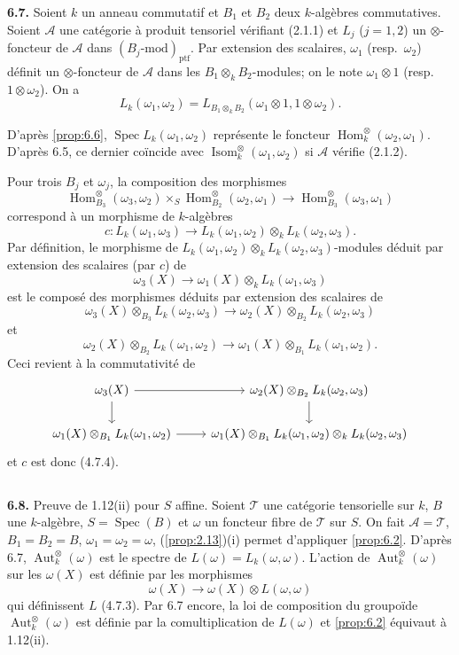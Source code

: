 \documentclass[12pt,a4paper]{article}
\theoremstyle{plain}
\theoremstyle{definition}
\theoremstyle{remark}
\DeclareMathOperator{\Hom}{Hom}
\DeclareMathOperator{\Aut}{Aut}
\DeclareMathOperator{\Isom}{Isom}
\DeclareMathOperator{\Spec}{Spec}
\begin{document}
\textbf{6.7.} Soient $k$ un anneau commutatif et $B_1$ et $B_2$ deux $k$-algèbres commutatives. Soient $\mathcal{A}$ une catégorie à produit tensoriel vérifiant (2.1.1) et $L_j$ ($j = 1,2$) un $\otimes$-foncteur de $\mathcal{A}$ dans $(B_j\text{-mod})_\mathrm{ptf}$. Par extension des scalaires, $\omega_1$ (resp.~$\omega_2$) définit un $\otimes$-foncteur de $\mathcal{A}$ dans les $B_1 \otimes_k B_2$-modules; on le note $\omega_1 \otimes 1$ (resp.~$1 \otimes \omega_2$). On a
\[
L_k(\omega_1, \omega_2) = L_{B_1 \otimes_k B_2}(\omega_1 \otimes 1, 1 \otimes \omega_2).
\]

D'après \ref{prop:6.6}, $\Spec L_k(\omega_1,\omega_2)$ représente le foncteur $\Hom^\otimes_k(\omega_2,\omega_1)$. D'après 6.5, ce dernier coïncide avec $\Isom^\otimes_k(\omega_1,\omega_2)$ si $\mathcal{A}$ vérifie (2.1.2).

Pour trois $B_j$ et $\omega_j$, la composition des morphismes
\[
\Hom^\otimes_{B_3}(\omega_3,\omega_2) \times_S \Hom^\otimes_{B_2}(\omega_2,\omega_1) \to \Hom^\otimes_{B_3}(\omega_3,\omega_1)
\]
correspond à un morphisme de $k$-algèbres
\[
c : L_k(\omega_1,\omega_3) \to L_k(\omega_1,\omega_2) \otimes_k L_k(\omega_2,\omega_3).
\]
Par définition, le morphisme de $L_k(\omega_1,\omega_2) \otimes_k L_k(\omega_2,\omega_3)$-modules déduit par extension des scalaires (par $c$) de
\[
\omega_3(X) \to \omega_1(X) \otimes_k L_k(\omega_1,\omega_3)
\]
est le composé des morphismes déduits par extension des scalaires de
\[
\omega_3(X) \otimes_{B_3} L_k(\omega_2,\omega_3) \to \omega_2(X) \otimes_{B_2} L_k(\omega_2,\omega_3)
\]
et
\[
\omega_2(X) \otimes_{B_2} L_k(\omega_1,\omega_2) \to \omega_1(X) \otimes_{B_1} L_k(\omega_1,\omega_2).
\]
Ceci revient à la commutativité de
\[
\begin{tikzcd}
\omega_3(X) \arrow[r] \arrow[d] & \omega_2(X) \otimes_{B_2} L_k(\omega_2,\omega_3) \arrow[d] \\
\omega_1(X) \otimes_{B_1} L_k(\omega_1,\omega_2) \arrow[r] & \omega_1(X) \otimes_{B_1} L_k(\omega_1,\omega_2) \otimes_k L_k(\omega_2,\omega_3)
\end{tikzcd}
\]
et $c$ est donc (4.7.4).

\subsection{}

\textbf{6.8.} Preuve de 1.12(ii) pour $S$ affine. Soient $\mathcal{T}$ une catégorie tensorielle sur $k$, $B$ une $k$-algèbre, $S = \Spec(B)$ et $\omega$ un foncteur fibre de $\mathcal{T}$ sur $S$. On fait $\mathcal{A} = \mathcal{T}$, $B_1 = B_2 = B$, $\omega_1 = \omega_2 = \omega$, (\ref{prop:2.13})(i) permet d'appliquer \ref{prop:6.2}. D'après 6.7, $\Aut^\otimes_k(\omega)$ est le spectre de $L(\omega) = L_k(\omega,\omega)$. L'action de $\Aut^\otimes_k(\omega)$ sur les $\omega(X)$ est définie par les morphismes
\[
\omega(X) \to \omega(X) \otimes L(\omega,\omega)
\]
qui définissent $L$ (4.7.3). Par 6.7 encore, la loi de composition du groupoïde $\Aut^\otimes_k(\omega)$ est définie par la comultiplication de $L(\omega)$ et \ref{prop:6.2} équivaut à 1.12(ii).
\end{document}
